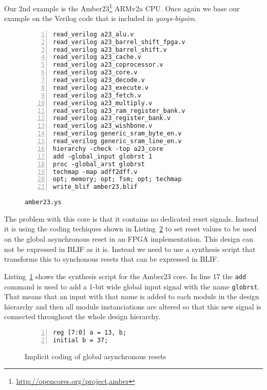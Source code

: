 Our 2nd example is the Amber23\footnote{\url{http://opencores.org/project,amber}}
ARMv2a CPU. Once again we base our example on the Verilog code that is included
in {\it yosys-bigsim}.

\begin{figure}[b!]
\begin{lstlisting}[frame=trBL,xleftmargin=1.5em,numbers=left]
read_verilog a23_alu.v
read_verilog a23_barrel_shift_fpga.v
read_verilog a23_barrel_shift.v
read_verilog a23_cache.v
read_verilog a23_coprocessor.v
read_verilog a23_core.v
read_verilog a23_decode.v
read_verilog a23_execute.v
read_verilog a23_fetch.v
read_verilog a23_multiply.v
read_verilog a23_ram_register_bank.v
read_verilog a23_register_bank.v
read_verilog a23_wishbone.v
read_verilog generic_sram_byte_en.v
read_verilog generic_sram_line_en.v
hierarchy -check -top a23_core
add -global_input globrst 1
proc -global_arst globrst
techmap -map adff2dff.v
opt; memory; opt; fsm; opt; techmap
write_blif amber23.blif
\end{lstlisting}
 \renewcommand{\figurename}{Listing}
\caption{\tt amber23.ys}
\label{aber23.ys}
\end{figure}

The problem with this core is that it contains no dedicated reset signals.
Instead it is using the coding techiques shown in Listing~\ref{glob_arst} to
set reset values to be used on the global asynchronous reset in an FPGA
implementation. This design can not be expressed in BLIF as it is. Instead we
need to use a synthesis script that transforms this to synchonous resets that
can be expressed in BLIF.

\medskip

Listing~\ref{aber23.ys} shows the synthesis script for the Amber23 core. In
line 17 the {\tt add} command is used to add a 1-bit wide global input signal
with the name {\tt globrst}. That means that an input with that name is added
to each module in the design hierarchy and then all module instanciations are
altered so that this new signal is connected throughout the whole design
hierarchy.

\begin{figure}[t!]
\begin{lstlisting}[frame=trBL,xleftmargin=1.5em,numbers=left]
reg [7:0] a = 13, b;
initial b = 37;
\end{lstlisting}
 \renewcommand{\figurename}{Listing}
\caption{Implicit coding of global asynchronous resets}
\label{glob_arst}
\end{figure}

